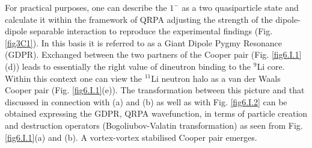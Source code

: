 \begin{subappendices}
For practical purposes, one can describe the  $1^-$ as a two quasiparticle state and calculate it within  the framework of QRPA adjusting the strength of the dipole-dipole separable interaction to reproduce the  experimental findings (Fig. \ref{fig3C1}). In this basis it is referred to  as a Giant Dipole Pygmy Resonance (GDPR). Exchanged between the  two partners of the Cooper pair (Fig. \ref{fig6.I.1}(d)) leads to essentially the right value of  dineutron binding  to the $^9$Li core. Within this context  one can view the
$^{11}$Li neutron halo as a van der Waals Cooper pair (Fig. \ref{fig6.I.1}(e)). The transformation between this picture and  that discussed in connection with 
(a) and (b) as well as with Fig. \ref{fig6.I.2} can be obtained  expressing the GDPR, QRPA wavefunction, in terms of particle  creation and destruction operators (Bogoliubov-Valatin transformation) as seen from Fig. \ref{fig6.I.1}(a) and (b). 
A vortex-vortex  stabilised Cooper pair emerges. 


\end{subappendices}
